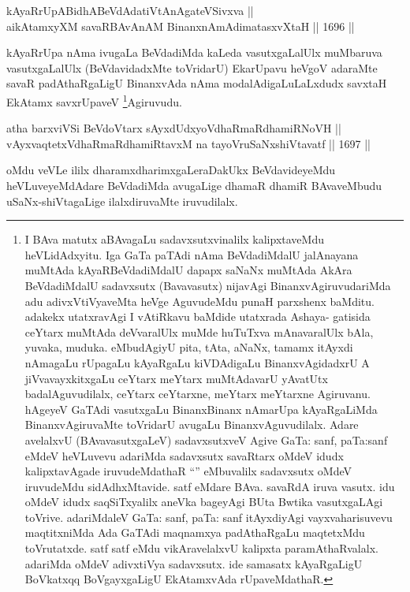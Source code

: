 \begin{shl}
kAyaRrUpABidhABeVdAdatiVtAnAgateVSivxva || \\
aikAtamxyXM savaRBAvAnAM BinanxnAmAdimatasxvXtaH \hfill || 1696 ||  
\end{shl}

\begin{artha}
kAyaRrUpa nAma ivugaLa BeVdadiMda kaLeda vasutxgaLalUlx muMbaruva vasutxgaLalUlx (BeVdavidadxMte toVridarU) EkarUpavu heVgoV adaraMte savaR padAthaRgaLigU BinanxvAda nAma modalAdigaLuLaLxdudx savxtaH EkAtamx savxrUpaveV \footnote{I BAva matutx aBAvagaLu sadavxsutxvinalilx kalipxtaveMdu heVLidAdxyitu. Iga GaTa paTAdi nAma BeVdadiMdalU jalAnayana muMtAda kAyaRBeVdadiMdalU dapapx saNaNx muMtAda AkAra BeVdadiMdalU sadavxsutx (Bavavasutx) nijavAgi BinanxvAgiruvudariMda adu adivxVtiVyaveMta heVge AguvudeMdu punaH parxshenx baMditu. adakekx utatxravAgi I vAtiRkavu baMdide utatxrada Ashaya- gatisida ceYtarx muMtAda deVvaralUlx muMde huTuTxva mAnavaralUlx bAla, yuvaka, muduka. eMbudAgiyU pita, tAta, aNaNx, tamamx itAyxdi nAmagaLu rUpagaLu kAyaRgaLu kiVDAdigaLu BinanxvAgidadxrU A jiVvavayxkitxgaLu ceYtarx meYtarx muMtAdavarU yAvatUtx badalAguvudilalx, ceYtarx ceYtarxne, meYtarx meYtarxne Agiruvanu. hAgeyeV GaTAdi vasutxgaLu BinanxBinanx nAmarUpa kAyaRgaLiMda BinanxvAgiruvaMte toVridarU avugaLu BinanxvAguvudilalx. Adare avelalxvU (BAvavasutxgaLeV) sadavxsutxveV Agive GaTa: sanf, paTa:sanf eMdeV heVLuvevu adariMda sadavxsutx savaRtarx oMdeV idudx kalipxtavAgade iruvudeMdathaR ``\stext'' eMbuvalilx sadavxsutx oMdeV iruvudeMdu sidAdhxMtavide. satf eMdare BAva. savaRdA iruva vasutx. idu oMdeV idudx saqSiTxyalilx aneVka bageyAgi BUta Bwtika vasutxgaLAgi toVrive. adariMdaleV GaTa: sanf, paTa: sanf itAyxdiyAgi vayxvaharisuvevu maqtitxniMda Ada GaTAdi maqnamxya padAthaRgaLu maqtetxMdu toVrutatxde. satf satf eMdu vikAravelalxvU kalipxta paramAthaRvalalx. adariMda oMdeV adivxtiVya sadavxsutx. ide samasatx kAyaRgaLigU BoVkatxqq BoVgayxgaLigU EkAtamxvAda rUpaveMdathaR.}Agiruvudu.
\end{artha}

\begin{shl}
atha barxviVSi BeVdoV\s tarx sAyxdUdxyoVdhaRmaRdhamiRNoVH || \\
vAyxvaqtetxVdhaRmaRdhamiRtavxM na tayoVruSaNxshiVtavatf \hfill || 1697 ||  
\end{shl}

\begin{artha}
oMdu veVLe ililx dharamxdharimxgaLeraDakUkx BeVdavideyeMdu heVLuveyeMdAdare BeVdadiMda avugaLige dhamaR dhamiR BAvaveMbudu uSaNx-shiVtagaLige ilalxdiruvaMte iruvudilalx.
\end{artha}

